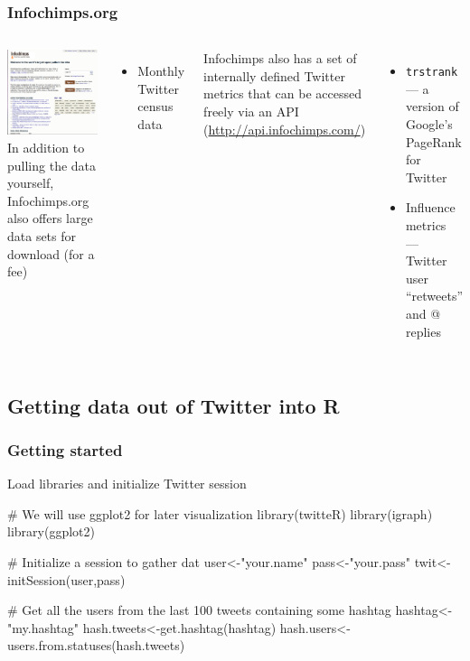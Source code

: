 \documentclass[xcolor=dvipsnames, 9pt]{beamer}
\newenvironment{code}{\begin{semiverbatim} \begin{footnotesize}}
{\end{footnotesize}\end{semiverbatim}}
\begin{document}
\begin{frame}[fragile]
    \frametitle{Infochimps.org}
    \begin{columns}
            \includegraphics[width=5.5cm]{../images/home_450.png}
        In addition to pulling the data yourself, Infochimps.org also offers large data sets for download (for a fee)
        \begin{itemize}
            \item Monthly Twitter census data
        \end{itemize}
        Infochimps also has a set of internally defined Twitter metrics that can be accessed freely via an API (\url{http://api.infochimps.com/})
        \begin{itemize}
            \item \texttt{trstrank} --- a version of Google's PageRank for Twitter
            \item Influence metrics --- Twitter user ``retweets'' and @ replies
        \end{itemize}
    \end{columns}
\end{frame}


\subsection{Getting data out of Twitter into R} %
\label{sub:getting_data_out_of_twitter_into_r}


\begin{frame}[fragile]
    \frametitle{Getting started}
    \begin{block}{Load libraries and initialize Twitter session}
\begin{code}
\alert<2>{# We will use ggplot2 for later visualization
library(twitteR)
library(igraph)
library(ggplot2)}

\alert<3>{# Initialize a session to gather dat
user<-"your.name"
pass<-"your.pass"
twit<-initSession(user,pass)}

\alert<4>{# Get all the users from the last 100 tweets containing some hashtag
hashtag<-"my.hashtag"
hash.tweets<-get.hashtag(hashtag)
hash.users<-users.from.statuses(hash.tweets)}
\end{code}
    \end{block}
\end{frame}
\end{document}
